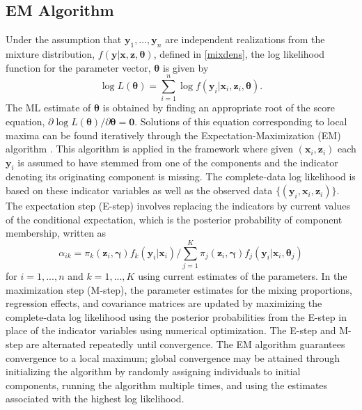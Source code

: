 \documentclass[10pt]{article}
\newcommand{\B}[0]{\mathbf}
\newcommand{\bs}[0]{\boldsymbol}
\begin{document}
\subsection{EM Algorithm}
Under the assumption that $\B y_{1},...,\B y_{n}$ are independent realizations from the mixture distribution, $f(\B y | \B x, \B z, \bs\theta)$, defined in \ref{mixdens}, the log likelihood function for the parameter vector, $\bs \theta$ is given by
$$\log L(\bs\theta)=\sum^{n}_{i=1}\log f(\B y_{i}|\B x_{i},\B z_{i},\bs \theta).$$
The ML estimate of $\bs\theta$ is obtained by finding an appropriate root of the score equation, $\partial \log L(\bs\theta)/\partial \bs\theta=\B 0.$
Solutions of this equation corresponding to local maxima can be found iteratively through the Expectation-Maximization (EM) algorithm \cite{dempster1977}. This algorithm is applied in the framework where given $(\B x_{i},\B z_{i})$ each $\B y_{i}$ is assumed to have stemmed from one of the components and the indicator denoting its originating component is missing. The complete-data log likelihood is based on these indicator variables as well as the observed data $\{(\B y_{i}, \B x_{i}, \B z_{i})\}$. The expectation step (E-step) involves replacing the indicators by current values of the conditional expectation, which is the posterior probability of component membership, written as
$$\alpha_{ik}=\pi_{k}(\B z_{i},\bs\gamma)f_{k}(\B y_{i}|\B x_{i})/\sum_{j=1}^{K}\pi_{j}(\B z_{i},\bs\gamma)f_{j}(\B y_{i}|\B x_{i},\bs \theta_{j})$$
for $i=1,...,n$ and $k=1,...,K$ using current estimates of the parameters. In the maximization step (M-step), the parameter estimates for the mixing proportions, regression effects, and covariance matrices are updated by maximizing the complete-data log likelihood using the posterior probabilities from the E-step in place of the indicator variables using numerical optimization. The E-step and M-step are alternated repeatedly until convergence. The EM algorithm guarantees convergence to a local maximum; global convergence may be attained through initializing the algorithm by randomly assigning individuals to initial components, running the algorithm multiple times, and using the estimates associated with the highest log likelihood.
\end{document}
